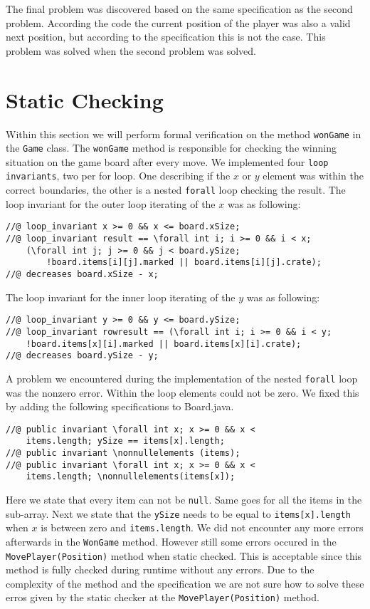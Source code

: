 \documentclass[a4paper]{article}
\begin{document}
	The final problem was discovered based on the same specification as the second problem. According the code the current position of the player was also a valid next position, but according to the specification this is not the case. This problem was solved when the second problem was solved.
	
	\newpage
	\section{Static Checking}
	\label{sec:staticchecking}
	Within this section we will perform formal verification on the method \texttt{wonGame} in the \texttt{Game} class. The \texttt{wonGame} method is responsible for checking the winning situation on the game board after every move.
	\newline 
	We implemented four \texttt{loop invariants}, two per for loop. One describing if the $x$ or $y$ element was within the correct boundaries, the other is a nested \texttt{forall} loop checking the result. The loop invariant for the outer loop iterating of the $x$ was as following:
	\begin{lstlisting}
//@ loop_invariant x >= 0 && x <= board.xSize;
//@ loop_invariant result == \forall int i; i >= 0 && i < x; 
	(\forall int j; j >= 0 && j < board.ySize; 
		!board.items[i][j].marked || board.items[i][j].crate);
//@ decreases board.xSize - x;
	\end{lstlisting}
	The loop invariant for the inner loop iterating of the $y$ was as following:
	\begin{lstlisting}
//@ loop_invariant y >= 0 && y <= board.ySize;
//@ loop_invariant rowresult == (\forall int i; i >= 0 && i < y; 
	!board.items[x][i].marked || board.items[x][i].crate);
//@ decreases board.ySize - y;
	\end{lstlisting}
	
	A problem we encountered during the implementation of the nested \texttt{forall} loop was the nonzero error. Within the loop elements could not be zero. We fixed this by adding the following specifications to Board.java.
	\begin{lstlisting}
//@ public invariant \forall int x; x >= 0 && x <
    items.length; ySize == items[x].length;
//@ public invariant \nonnullelements (items);
//@ public invariant \forall int x; x >= 0 && x <
    items.length; \nonnullelements(items[x]);	
	\end{lstlisting}
	Here we state that every item can not be \texttt{null}. Same goes for all the items in the sub-array. Next we state that the \texttt{ySize} needs to be equal to \texttt{items[x].length} when $x$ is between zero and \texttt{items.length}. 
	\newline
	We did not encounter any more errors afterwards in the \texttt{WonGame} method. However still some errors occured in the \texttt{MovePlayer(Position)} method when static checked. This is acceptable since this method is fully checked during runtime without any errors. Due to the complexity of the method and the specification we are not sure how to solve these erros given by the static checker at the \texttt{MovePlayer(Position)} method.
	
\end{document}
